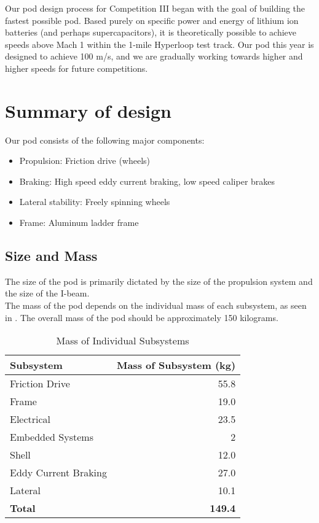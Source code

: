 \documentclass[main.tex]{subfiles}
\begin{document}
Our pod design process for Competition III began with the goal of building the fastest possible pod. Based purely on specific power and energy of lithium ion batteries (and perhaps supercapacitors), it is theoretically possible to achieve speeds above Mach 1 within the 1-mile Hyperloop test track. Our pod this year is designed to achieve 100 m/s, and we are gradually working towards higher and higher speeds for future competitions.

\section{Summary of design}
Our pod consists of the following major components:
\begin{itemize}
    \item Propulsion: Friction drive (wheels)
    \item Braking: High speed eddy current braking, low speed caliper brakes
    \item Lateral stability: Freely spinning wheels
    \item Frame: Aluminum ladder frame
\end{itemize}

\subsection{Size and Mass}
The size of the pod is primarily dictated by the size of the propulsion system and the size of the I-beam.\\
  The mass of the pod depends on the individual mass of each subsystem, as seen in . The overall mass of the pod should be approximately 150 kilograms.

\begin{table}[H]
\begin{tabular}{@{}lr@{}} 
	\toprule Subsystem & Mass of Subsystem (\si{kg}) \\ \midrule
    Friction Drive & 55.8 \\
    Frame & 19.0 \\
    Electrical & 23.5 \\
    Embedded Systems & 2 \\
    Shell & 12.0 \\
    Eddy Current Braking & 27.0 \\
    Lateral & 10.1 \\ \midrule
    \textbf{Total} & \textbf{149.4}
\end{tabular}
  \caption{Mass of Individual Subsystems}
  \label{table:mass}
\end{table}
\end{document}

